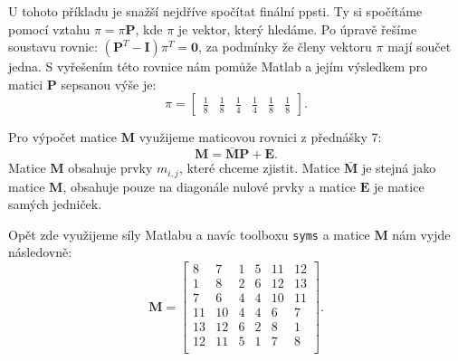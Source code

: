 \documentclass{article}
\begin{document}
U tohoto příkladu je snažší nejdříve spočítat finální ppsti.  Ty si spočítáme pomocí vztahu $\pi = \pi \mathbf{P}$, kde $\pi$ je vektor, který hledáme. Po úpravě řešíme soustavu rovnic: $(\mathbf{P}^T - \mathbf{I})\pi^T = \mathbf{0}$, za podmínky že členy vektoru $\pi$ mají součet jedna.
S vyřešením této rovnice nám pomůže Matlab a jejím výsledkem pro matici $\mathbf P$ sepsanou výše je:
\[
\pi = 
\begin{bmatrix}
    \frac 1 8 & \frac 1 8 & \frac 1 4 & \frac 1 4 &  \frac 1 8 & \frac 1 8 
\end{bmatrix}.
\]


Pro výpočet matice $\mathbf{M}$  využijeme maticovou rovnici z přednášky 7:
\[
\mathbf{M} = \bar{\mathbf{M}} \mathbf{P} + \mathbf{E}.
\]
Matice $\mathbf{M}$ obsahuje prvky $m_{i,j}$, které chceme zjistit. Matice $\bar{\mathbf{M}}$ je stejná jako matice $\mathbf{M}$, obsahuje pouze na diagonále nulové prvky a matice $\mathbf{E}$ je matice samých jedniček.

Opět zde využijeme síly Matlabu a navíc toolboxu \verb|syms| a matice $\mathbf{M}$ nám vyjde následovně:
\[
    \mathbf{M} = 
\begin{bmatrix}
8 & 7 & 1 & 5 & 11 & 12 \\
1 & 8 & 2 & 6 & 12 & 13 \\
7 & 6 & 4 & 4 & 10 & 11 \\
11 & 10 & 4 & 4 & 6 & 7 \\
13 & 12 & 6 & 2 & 8 & 1 \\
12 & 11 & 5 & 1 & 7 & 8 \\
\end{bmatrix}.
\]
\end{document}

